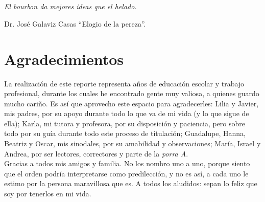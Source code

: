 \chapter*{}\label{epigrafe}
\thispagestyle{empty}
\begin{flushright}
	\begin{Large}
		\textit{El bourbon da mejores ideas que el helado.}\\
	\end{Large}
Dr. José Galaviz Casas ``Elogio de la pereza''.
\end{flushright}
\clearpage

\chapter*{Agradecimientos}\label{agradecimientos}
\thispagestyle{empty}
\noindent La realización de este reporte representa años de educación escolar y trabajo profesional, durante los cuales he encontrado gente muy valiosa, a quienes guardo mucho cariño. Es así que aprovecho este espacio para agradecerles: Lilia y Javier, mis padres, por su apoyo durante todo lo que va de mi vida (y lo que sigue de ella); Karla, mi tutora y profesora, por su disposición y paciencia, pero sobre todo por su guía durante todo este proceso de titulación; Guadalupe, Hanna, Beatriz y Oscar, mis sinodales, por su amabilidad y observaciones; María, Israel y Andrea, por ser lectores, correctores y parte de la \textit{porra A}.\\
\indent Gracias a todos mis amigos y familia. No los nombro uno a uno, porque siento que el orden podría interpretarse como predilección, y no es así, a cada uno le estimo por la persona maravillosa que es. A todos los aludidos: sepan lo feliz que soy por tenerlos en mi vida.
\clearpage

